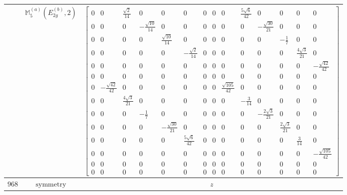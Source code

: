 \documentclass[fleqn,8pt,landscape]{jsarticle}
\begin{document}
\begin{longtable}{ccc}
$  $ & $ \mathbb{M}_{5}^{(a)}(E_{2g}^{(b)},2) $ & $ \begin{bmatrix} 0 & 0 & \frac{\sqrt{2}}{14} & 0 & 0 & 0 & 0 & 0 & 0 & \frac{5 \sqrt{6}}{42} & 0 & 0 & 0 & 0 \\ 0 & 0 & 0 & - \frac{\sqrt{10}}{14} & 0 & 0 & 0 & 0 & 0 & 0 & - \frac{\sqrt{30}}{21} & 0 & 0 & 0 \\ 0 & 0 & 0 & 0 & \frac{\sqrt{10}}{14} & 0 & 0 & 0 & 0 & 0 & 0 & - \frac{1}{7} & 0 & 0 \\ 0 & 0 & 0 & 0 & 0 & - \frac{\sqrt{2}}{14} & 0 & 0 & 0 & 0 & 0 & 0 & \frac{4 \sqrt{3}}{21} & 0 \\ 0 & 0 & 0 & 0 & 0 & 0 & 0 & 0 & 0 & 0 & 0 & 0 & 0 & - \frac{\sqrt{42}}{42} \\ 0 & 0 & 0 & 0 & 0 & 0 & 0 & 0 & 0 & 0 & 0 & 0 & 0 & 0 \\ 0 & - \frac{\sqrt{42}}{42} & 0 & 0 & 0 & 0 & 0 & 0 & \frac{\sqrt{105}}{42} & 0 & 0 & 0 & 0 & 0 \\ 0 & 0 & \frac{4 \sqrt{3}}{21} & 0 & 0 & 0 & 0 & 0 & 0 & - \frac{3}{14} & 0 & 0 & 0 & 0 \\ 0 & 0 & 0 & - \frac{1}{7} & 0 & 0 & 0 & 0 & 0 & 0 & - \frac{2 \sqrt{3}}{21} & 0 & 0 & 0 \\ 0 & 0 & 0 & 0 & - \frac{\sqrt{30}}{21} & 0 & 0 & 0 & 0 & 0 & 0 & \frac{2 \sqrt{3}}{21} & 0 & 0 \\ 0 & 0 & 0 & 0 & 0 & \frac{5 \sqrt{6}}{42} & 0 & 0 & 0 & 0 & 0 & 0 & \frac{3}{14} & 0 \\ 0 & 0 & 0 & 0 & 0 & 0 & 0 & 0 & 0 & 0 & 0 & 0 & 0 & - \frac{\sqrt{105}}{42} \\ 0 & 0 & 0 & 0 & 0 & 0 & 0 & 0 & 0 & 0 & 0 & 0 & 0 & 0 \\ 0 & 0 & 0 & 0 & 0 & 0 & 0 & 0 & 0 & 0 & 0 & 0 & 0 & 0 \end{bmatrix} $ \\ \hline
$ 968 $ & $ \text{symmetry} $ & $ z $ \\

\end{longtable}
\end{document}
